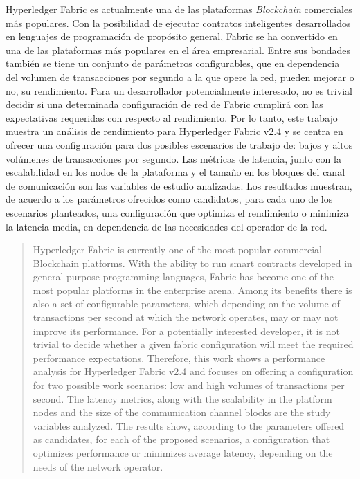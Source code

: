 \begin{resumen}
Hyperledger Fabric es actualmente una de las plataformas \emph{Blockchain} comerciales m\'as populares. Con la posibilidad de ejecutar contratos inteligentes desarrollados en lenguajes de programaci\'on de prop\'osito general, Fabric se ha convertido en una de las plataformas m\'as populares en el \'area empresarial. Entre sus bondades tambi\'en se tiene un conjunto de par\'ametros configurables, que en dependencia del volumen de transacciones por segundo a la que opere la red, pueden mejorar o no, su rendimiento. Para un desarrollador potencialmente interesado, no es trivial decidir si una determinada configuraci\'on de red de Fabric cumplir\'a con las expectativas requeridas con respecto al rendimiento. Por lo tanto, este trabajo muestra un an\'alisis de rendimiento para Hyperledger Fabric v2.4 y se centra en ofrecer una configuraci\'on para dos posibles escenarios de trabajo de: bajos y altos vol\'umenes de transacciones por segundo. Las m\'etricas de latencia, junto con la escalabilidad en los nodos de la plataforma y el tama\~no en los bloques del canal de comunicaci\'on son las variables de estudio analizadas. Los resultados muestran, de acuerdo a los par\'ametros ofrecidos como candidatos, para cada uno de los escenarios planteados, una configuraci\'on que optimiza el rendimiento o minimiza la latencia media, en dependencia de las necesidades del operador de la red.
\end{resumen}

\begin{abstract}
Hyperledger Fabric is currently one of the most popular commercial Blockchain platforms. With the ability to run smart contracts developed in general-purpose programming languages, Fabric has become one of the most popular platforms in the enterprise arena. Among its benefits there is also a set of configurable parameters, which depending on the volume of transactions per second at which the network operates, may or may not improve its performance. For a potentially interested developer, it is not trivial to decide whether a given fabric configuration will meet the required performance expectations. Therefore, this work shows a performance analysis for Hyperledger Fabric v2.4 and focuses on offering a configuration for two possible work scenarios: low and high volumes of transactions per second. The latency metrics, along with the scalability in the platform nodes and the size of the communication channel blocks are the study variables analyzed. The results show, according to the parameters offered as candidates, for each of the proposed scenarios, a configuration that optimizes performance or minimizes average latency, depending on the needs of the network operator.
\end{abstract}